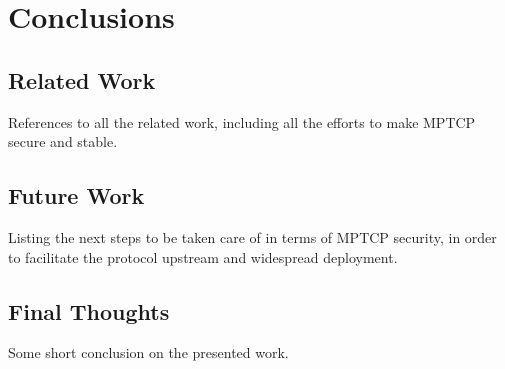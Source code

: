 \chapter{Conclusions}
\label{chap:conclusions}

\section{Related Work}
References to all the related work, including all the efforts to make MPTCP secure and stable.

\section{Future Work}
Listing the next steps to be taken care of in terms of MPTCP security, in order to facilitate the protocol upstream and widespread deployment.

\section{Final Thoughts}
Some short conclusion on the presented work.